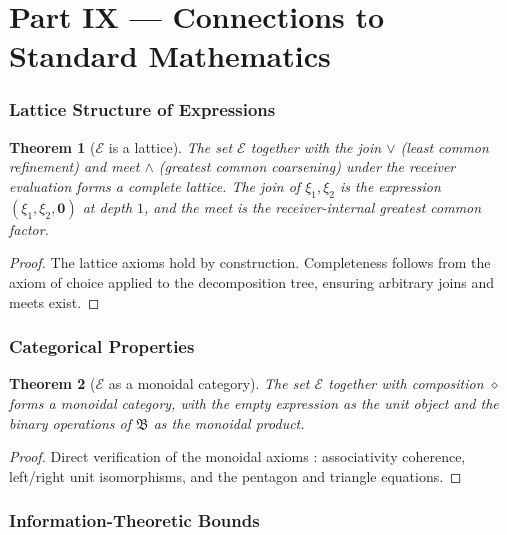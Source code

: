 \documentclass[twocolumn,11pt,a4paper]{article}
\theoremstyle{thmstyle}
\newtheorem{theorem}{Theorem}[section]
\theoremstyle{thmstyle}
\theoremstyle{definition}
\theoremstyle{remark}
\newcommand{\Expr}{\mathcal{E}}
\begin{document}
\part*{Part IX --- Connections to Standard Mathematics}

\section{Lattice Structure of Expressions}
\label{sec:lattice}

\begin{theorem}[$\Expr$ is a lattice]
\label{thm:expr-lattice}
The set $\Expr$ together with the join $\vee$
(least common refinement) and meet $\wedge$
(greatest common coarsening) under the receiver
evaluation forms a complete lattice.  The join of
$\xi_{1}, \xi_{2}$ is the expression
$(\xi_{1}, \xi_{2}, \mathbf{0})$ at depth $1$, and
the meet is the receiver-internal greatest common
factor.
\end{theorem}

\begin{proof}
The lattice axioms hold by construction.
Completeness follows from the axiom of choice
applied to the decomposition tree, ensuring
arbitrary joins and meets exist.
\end{proof}

\section{Categorical Properties}
\label{sec:categorical-properties}

\begin{theorem}[$\Expr$ as a monoidal category]
\label{thm:expr-monoidal}
The set $\Expr$ together with composition $\diamond$
forms a monoidal category, with the empty expression
as the unit object and the binary operations of
$\mathfrak{B}$ as the monoidal product.
\end{theorem}

\begin{proof}
Direct verification of the monoidal axioms
\citep{maclane1998}: associativity coherence,
left/right unit isomorphisms, and the pentagon and
triangle equations.
\end{proof}

\section{Information-Theoretic Bounds}
\label{sec:info-theoretic-bounds}
\end{document}
